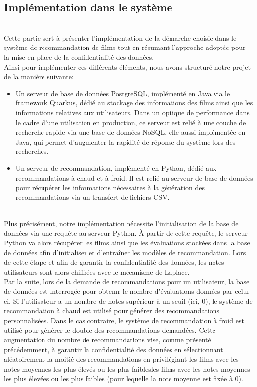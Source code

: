 \documentclass{article}
\begin{document}
\subsection{Implémentation dans le système}
$ $\\
Cette partie sert à présenter l'implémentation de la démarche choisie dans le système de recommandation de films tout en résumant l'approche adoptée pour la mise en place de la confidentialité des données.\\
Ainsi pour implémenter ces différents éléments, nous avons structuré notre projet de la manière suivante:\\
\begin{itemize}
    \item Un serveur de base de données  PostgreSQL, implémenté en Java via le framework Quarkus, dédié au stockage des informations des films ainsi que les informations relatives aux utilisateurs.
    Dans un optique de performance dans le cadre d'une utilisation en production, ce serveur est relié à une couche de recherche rapide via une base de données NoSQL, elle aussi implémentée en Java, 
    qui permet d'augmenter la rapidité de réponse du système lors des recherches.
    \item Un serveur de recommandation, implémenté en Python, dédié aux recommandations à chaud et à froid. Il est relié au serveur de base de données pour récupérer les 
    informations nécessaires à la génération des recommandations via un transfert de fichiers CSV.
\end{itemize}
$ $\\
Plus précisément, notre implémentation nécessite l'initialisation de la base de données via une requête au serveur Python. À partir de cette requête, le serveur Python va alors 
récupérer les films ainsi que les évaluations stockées dans la base de données afin d'initialiser et d'entraîner les modèles de recommandation. Lors de cette étape et afin de garantir 
la confidentialité des données, les notes utilisateurs sont alors chiffrées avec le mécanisme de Laplace.\\
Par la suite, lors de la demande de recommandations pour un utilisateur, la base de données est interrogée pour obtenir le nombre d’évaluations données par celui-ci. Si l'utilisateur a 
un nombre de notes supérieur à un seuil (ici, 0), le système de recommandation à chaud est utilisé pour générer des recommandations personnalisées. Dans le cas contraire, le système de 
recommandation à froid est utilisé pour générer le double des recommandations demandées. Cette augmentation du nombre de recommandations vise, comme présenté précédemment, à garantir la 
confidentialité des données en sélectionnant aléatoirement la moitié des recommandations en privilégiant les films avec les notes moyennes les plus élevés ou les plus faiblesles films avec les notes moyennes les plus élevées ou les plus faibles 
(pour lequelle la note moyenne est fixée à 0).
\end{document}
